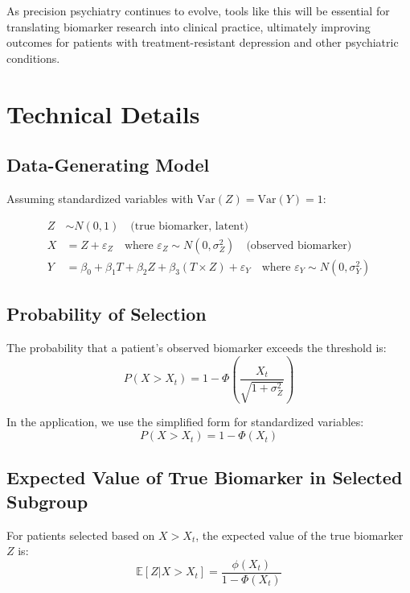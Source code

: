 \documentclass{article}
\begin{document}
As precision psychiatry continues to evolve, tools like this will be essential for translating biomarker research into clinical practice, ultimately improving outcomes for patients with treatment-resistant depression and other psychiatric conditions.

\appendix
\section{Technical Details}

\subsection{Data-Generating Model}

Assuming standardized variables with $\text{Var}(Z) = \text{Var}(Y) = 1$:

\begin{align}
Z &\sim N(0, 1) \quad \text{(true biomarker, latent)} \\
X &= Z + \varepsilon_Z \quad \text{where } \varepsilon_Z \sim N(0, \sigma^2_Z) \quad \text{(observed biomarker)} \\
Y &= \beta_0 + \beta_1 T + \beta_2 Z + \beta_3 (T \times Z) + \varepsilon_Y \quad \text{where } \varepsilon_Y \sim N(0, \sigma^2_Y)
\end{align}

\subsection{Probability of Selection}

The probability that a patient's observed biomarker exceeds the threshold is:
\begin{equation}
P(X > X_t) = 1 - \Phi\left(\frac{X_t}{\sqrt{1 + \sigma^2_Z}}\right)
\end{equation}

In the application, we use the simplified form for standardized variables:
\begin{equation}
P(X > X_t) = 1 - \Phi(X_t)
\end{equation}

\subsection{Expected Value of True Biomarker in Selected Subgroup}

For patients selected based on $X > X_t$, the expected value of the true biomarker $Z$ is:
\begin{equation}
\mathbb{E}[Z|X > X_t] = \frac{\phi(X_t)}{1 - \Phi(X_t)}
\end{equation}
\end{document}
